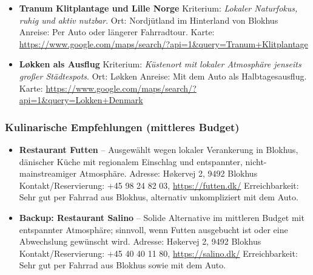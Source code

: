 \documentclass[a4paper,12pt]{article}
\begin{document}
\begin{itemize}
\item \textbf{Tranum Klitplantage und Lille Norge}\newline
Kriterium: \textit{Lokaler Naturfokus, ruhig und aktiv nutzbar}.\newline
Ort: Nordjütland im Hinterland von Blokhus\newline
Anreise: Per Auto oder längerer Fahrradtour.\newline
Karte: \url{https://www.google.com/maps/search/?api=1&query=Tranum+Klitplantage}

\item \textbf{Løkken als Ausflug}\newline
Kriterium: \textit{Küstenort mit lokaler Atmosphäre jenseits großer Städtespots}.\newline
Ort: Løkken\newline
Anreise: Mit dem Auto als Halbtagesausflug.\newline
Karte: \url{https://www.google.com/maps/search/?api=1&query=Lokken+Denmark}
\end{itemize}

\subsubsection{Kulinarische Empfehlungen (mittleres Budget)}
\begin{itemize}
\item \textbf{Restaurant Futten} -- Ausgewählt wegen lokaler Verankerung in Blokhus, dänischer Küche mit regionalem Einschlag und entspannter, nicht-mainstreamiger Atmosphäre.\newline
Adresse: Høkervej 2, 9492 Blokhus\newline
Kontakt/Reservierung: +45 98 24 82 03, \url{https://futten.dk/}\newline
Erreichbarkeit: Sehr gut per Fahrrad aus Blokhus, alternativ unkompliziert mit dem Auto.

\item \textbf{Backup: Restaurant Salino} -- Solide Alternative im mittleren Budget mit entspannter Atmosphäre; sinnvoll, wenn Futten ausgebucht ist oder eine Abwechslung gewünscht wird.\newline
Adresse: Høkervej 2, 9492 Blokhus\newline
Kontakt/Reservierung: +45 40 40 11 80, \url{https://salino.dk/}\newline
Erreichbarkeit: Sehr gut per Fahrrad aus Blokhus sowie mit dem Auto.
\end{itemize}
\end{document}

